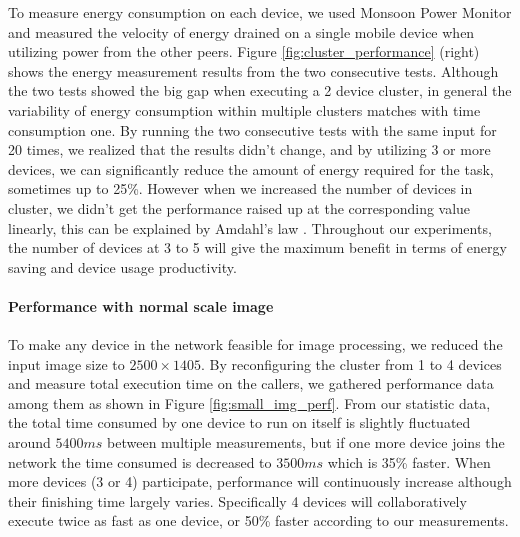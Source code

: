 \documentclass{sig-alternate}[10pt]
\begin{document}
\begin{CCSXML}
To measure energy consumption on each device, we used Monsoon Power Monitor \cite{moosoon} and measured the velocity of energy drained on a single mobile device when utilizing power from the other peers. Figure \ref{fig:cluster_performance} (right) shows the energy measurement results from the two consecutive tests. Although the two tests showed the big gap when executing a 2 device cluster, in general the variability of energy consumption within multiple clusters matches with time consumption one. By running the two consecutive tests with the same input for 20 times, we realized that the results didn't change, and by utilizing 3 or more devices, we can significantly reduce the amount of energy required for the task, sometimes up to 25\%. However when we increased the number of devices in cluster, we didn't get the performance raised up at the corresponding value linearly, this can be explained by Amdahl's law \cite{amdahl}. Throughout our experiments, the number of devices at 3 to 5 will give the maximum benefit in terms of energy saving and device usage productivity.

\paragraph{Performance with normal scale image}
To make any device in the network feasible for image processing, we reduced the input image size to $2500 \times 1405$. By reconfiguring the cluster from 1 to 4 devices and measure total execution time on the callers, we gathered performance data among them as shown in Figure \ref{fig:small_img_perf}. From our statistic data, the total time consumed by one device to run on itself is slightly fluctuated around $5400ms$ between multiple measurements, but if one more device joins the network the time consumed is decreased to $3500ms$ which is 35\% faster. When more devices (3 or 4) participate, performance will continuously increase although their finishing time largely varies. Specifically 4 devices will collaboratively execute twice as fast as one device, or 50\% faster according to our measurements.


\end{CCSXML}
\end{document}
